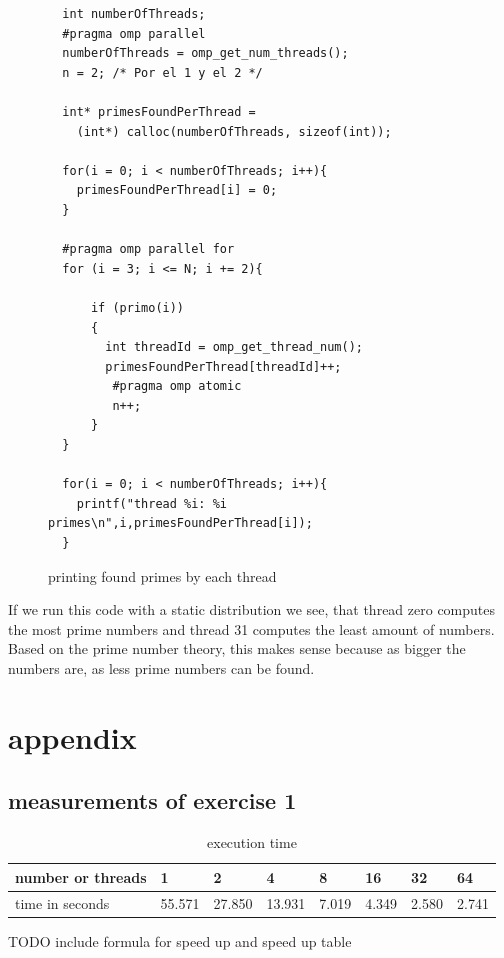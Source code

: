 \documentclass[11pt,a4paper]{article}
\begin{document}
\begin{figure}[h]
\label{code_printprimeseachthread}
\begin{lstlisting}
  int numberOfThreads;
  #pragma omp parallel
  numberOfThreads = omp_get_num_threads();
  n = 2; /* Por el 1 y el 2 */
  
  int* primesFoundPerThread = 
  	(int*) calloc(numberOfThreads, sizeof(int));
  	
  for(i = 0; i < numberOfThreads; i++){
    primesFoundPerThread[i] = 0;
  }
  
  #pragma omp parallel for
  for (i = 3; i <= N; i += 2){

      if (primo(i))
      {
        int threadId = omp_get_thread_num();
        primesFoundPerThread[threadId]++;
         #pragma omp atomic
         n++;
      }
  }
  
  for(i = 0; i < numberOfThreads; i++){
    printf("thread %i: %i primes\n",i,primesFoundPerThread[i]);
  }
\end{lstlisting} 
\caption{printing found primes by each thread}
\end{figure}

If we run this code with a static distribution we see, that thread zero computes the most prime numbers and thread 31 computes the least amount of numbers. Based on the prime number theory, this makes sense because as bigger the numbers are, as less prime numbers can be found.

\pagebreak

\section{appendix}

\subsection{measurements of exercise 1}

\begin{table}[h]
\centering
\label{measuresEx1}
\begin{tabular}{@{}l||l|l|l|l|l|l|l|@{}}
number or threads & 1      & 2      & 4      & 8     & 16    & 32    & 64    \\
\hline	
time in seconds   & 55.571 & 27.850 & 13.931 & 7.019 & 4.349 & 2.580 & 2.741
\end{tabular}
\caption{execution time}
\end{table}

TODO include formula for speed up and speed up table


\listoffigures

\listoftables






\end{document}
